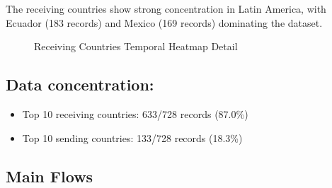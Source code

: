 \documentclass[
  11pt,
]{article}
\providecommand{\tightlist}{%
  \setlength{\itemsep}{0pt}\setlength{\parskip}{0pt}}\usepackage{longtable,booktabs,array}
\begin{document}
The receiving countries show strong concentration in Latin America, with
Ecuador (183 records) and Mexico (169 records) dominating the dataset.

\begin{figure}[H]


\caption{\label{fig-receiving-heatmap-detail}Receiving Countries
Temporal Heatmap Detail}

\end{figure}%

\subsection{Data concentration:}\label{data-concentration}

\begin{itemize}
\tightlist
\item
  Top 10 receiving countries: 633/728 records (87.0\%)
\item
  Top 10 sending countries: 133/728 records (18.3\%)
\end{itemize}

\subsection{Main Flows}\label{main-flows}
\end{document}

